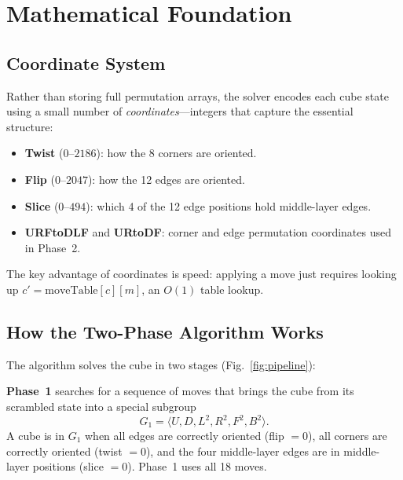 \documentclass[graybox]{svmult}
\begin{document}
\section{Mathematical Foundation}
\label{sec:math}

\subsection{Coordinate System}
\label{sec:coordinates}

Rather than storing full permutation arrays, the solver encodes each cube state using a small number of \emph{coordinates}---integers that capture the essential structure:

\begin{itemize}[leftmargin=*]
  \item \textbf{Twist} ($0$--$2186$): how the 8 corners are oriented.
  \item \textbf{Flip} ($0$--$2047$): how the 12 edges are oriented.
  \item \textbf{Slice} ($0$--$494$): which 4 of the 12 edge positions hold middle-layer edges.
  \item \textbf{URFtoDLF} and \textbf{URtoDF}: corner and edge permutation coordinates used in Phase~2.
\end{itemize}

The key advantage of coordinates is speed: applying a move just requires looking up $c' = \text{moveTable}[c][m]$, an $O(1)$ table lookup.

\subsection{How the Two-Phase Algorithm Works}
\label{sec:two-phase}

The algorithm solves the cube in two stages (Fig.~\ref{fig:pipeline}):

\textbf{Phase~1} searches for a sequence of moves that brings the cube from its scrambled state into a special subgroup
\begin{equation}
G_1 = \langle U, D, L^2, R^2, F^2, B^2 \rangle.
\end{equation}
A cube is in $G_1$ when all edges are correctly oriented (flip $= 0$), all corners are correctly oriented (twist $= 0$), and the four middle-layer edges are in middle-layer positions (slice $= 0$). Phase~1 uses all 18 moves.
\end{document}
